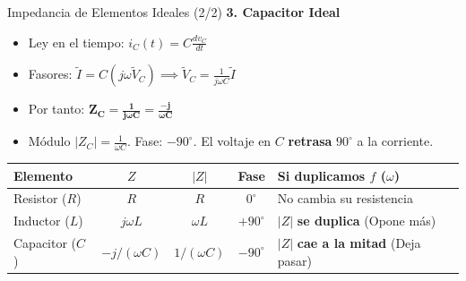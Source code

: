\documentclass[aspectratio=169, 10pt]{beamer}
\begin{document}
\begin{frame}{Impedancia de Elementos Ideales (2/2)}
    \textbf{3. Capacitor Ideal}
    \begin{itemize}
        \item Ley en el tiempo: $i_C(t) = C \frac{dv_C}{dt}$
        \item Fasores: $\tilde{I} = C (j\omega \tilde{V}_C) \implies \tilde{V}_C = \frac{1}{j\omega C} \tilde{I}$
        \item Por tanto: $\mathbf{Z_C = \frac{1}{j\omega C} = \frac{-j}{\omega C}}$
        \item Módulo $|Z_C| = \frac{1}{\omega C}$. Fase: $-90^\circ$. El voltaje en $C$ \textbf{retrasa} $90^\circ$ a la corriente.
    \end{itemize}
    
    \vspace{0.3cm}
    \renewcommand{\arraystretch}{1.5}
    \begin{center}
    \begin{tabular}{l c c c l}
    \toprule
    \textbf{Elemento} & \textbf{$Z$} & \textbf{$|Z|$} & \textbf{Fase} & \textbf{Si duplicamos $f$ ($\omega$)} \\
    \midrule
    Resistor ($R$) & $R$ & $R$ & $0^\circ$ & No cambia su resistencia \\
    Inductor ($L$) & $j\omega L$ & $\omega L$ & $+90^\circ$ & $|Z|$ \textbf{se duplica} (Opone más) \\
    Capacitor ($C$) & $-j/(\omega C)$ & $1/(\omega C)$ & $-90^\circ$ & $|Z|$ \textbf{cae a la mitad} (Deja pasar) \\
    \bottomrule
    \end{tabular}
    \end{center}
\end{frame}
\end{document}
